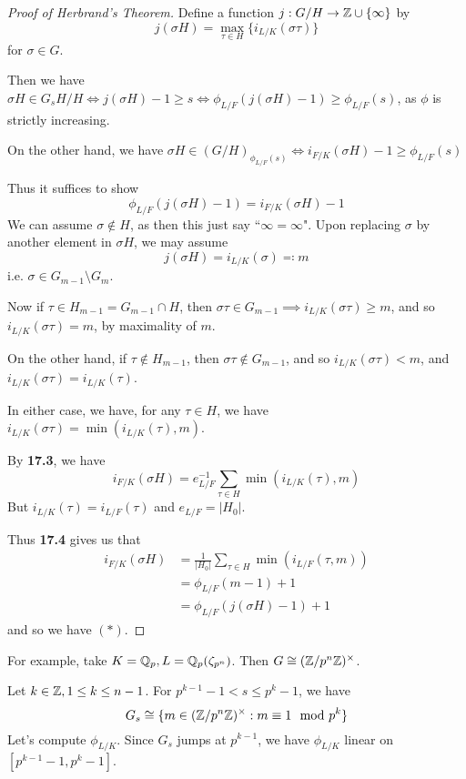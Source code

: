 \documentclass[10pt,a4paper]{article}
\begin{document}
\begin{proof}[Proof of Herbrand's Theorem]
  Define a function $j:G/H \to \mathbb{Z}\cup \{\infty\}$ by
  \[j(\sigma H) = \max_{\tau \in H}\{i_{L/K}(\sigma \tau)\}\]
  for $\sigma \in G$.

  Then we have $\sigma H \in G_sH/H \iff j(\sigma H)-1 \geq s \iff \phi_{L/F}(j(\sigma H) - 1) \geq \phi_{L/F}(s)$, as $\phi$ is strictly increasing.

  On the other hand, we have $\sigma H \in (G/H)_{\phi_{L/F}(s)} \iff i_{F/K}(\sigma H) - 1 \geq \phi_{L/F}(s)$

  Thus it suffices to show
  \[\phi_{L/F}(j(\sigma H)-1) = i_{F/K}(\sigma H) - 1 \tag{\ast}\]
  We can assume $\sigma \notin H$, as then this just say ``$\infty=\infty$". Upon replacing $\sigma$ by another element in $\sigma H$, we may assume
  \[j(\sigma H) = i_{L/K}(\sigma) \eqqcolon m\]
  i.e. $\sigma \in G_{m-1}\setminus G_m$.

  Now if $\tau \in H_{m-1} = G_{m-1}\cap H$, then $\sigma \tau \in G_{m-1} \implies i_{L/K}(\sigma \tau) \geq m$, and so $i_{L/K}(\sigma \tau) = m$, by maximality of $m$.

  On the other hand, if $\tau \notin H_{m-1}$, then $\sigma\tau \notin G_{m-1}$, and so $i_{L/K}(\sigma \tau) < m$, and $i_{L/K}(\sigma \tau) = i_{L/K}(\tau)$.

  In either case, we have, for any $\tau \in H$, we have $i_{L/K}(\sigma \tau) = \min(i_{L/K}(\tau), m)$.

  By \textbf{17.3}, we have
  \[i_{F/K}(\sigma H) = e_{L/F}^{-1}\sum_{\tau \in H}\min(i_{L/K}(\tau), m)\]
  But $i_{L/K}(\tau) = i_{L/F}(\tau)$ and $e_{L/F} = |H_0|$.

  Thus \textbf{17.4} gives us that
  \begin{align*}
    i_{F/K}(\sigma H) &= \frac{1}{|H_0|}\sum_{\tau \in H} \min(i_{L/F}(\tau, m))\\
    &= \phi_{L/F}(m-1)+1\\
    &= \phi_{L/F}(j(\sigma H)-1)+1
  \end{align*}
  and so we have $(\ast)$.
\end{proof}
For example, take $K = \mathbb{Q}_p, L = \mathbb{Q}_p(\zeta_{p^n})$. Then $G \cong (\mathbb{Z}/p^n\mathbb{Z})^\times$.

Let $k \in \mathbb{Z}, 1 \leq k \leq n-1$. For $p^{k-1}-1 < s \leq p^{k}-1$, we have
\[G_s \cong \{m \in (\mathbb{Z}/p^n\mathbb{Z})^\times: m \equiv 1 \mod p^k\}\]
Let's compute $\phi_{L/K}$. Since $G_s$ jumps at $p^{k-1}$, we have $\phi_{L/K}$ linear on $[p^{k-1}-1, p^k-1]$.
\end{document}
